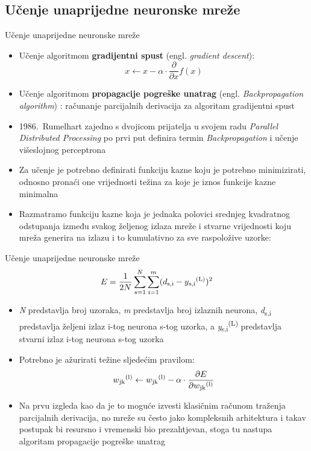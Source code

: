 \documentclass{beamer}
\begin{document}
    \subsection{Učenje unaprijedne neuronske mreže}
        \begin{frame}{Učenje unaprijedne neuronske mreže}
            \begin{itemize}
                \item Učenje algoritmom \textbf{gradijentni spust} (engl. \textit{gradient descent}):
                \[x \leftarrow x - \alpha \cdot{\frac{\partial}{\partial x}}f(x)\]
                \item Učenje algoritmom \textbf{propagacije pogreške unatrag} (engl. \textit{Backpropagation algorithm}) : računanje parcijalnih derivacija za algoritam gradijentni spust
                \item 1986.\ Rumelhart zajedno s dvojicom prijatelja u svojem radu \textit{Parallel Distributed Processing} po prvi put definira termin \textit{Backpropagation} i učenje višeslojnog perceptrona
                \item Za učenje je potrebno definirati funkciju kazne koju je potrebno minimizirati, odnosno pronaći one vrijednosti težina za koje je iznos funkcije kazne minimalna
                \item Razmatramo funkciju kazne koja je jednaka polovici srednjeg kvadratnog odstupanja između svakog željenog izlaza mreže i stvarne vrijednosti koju mreža generira na izlazu i to kumulativno za sve raspoložive uzorke:
            \end{itemize}
        \end{frame}
        \begin{frame}{Učenje unaprijedne neuronske mreže}
            \[E = \frac{1}{2N}\sum\limits_{s=1}^N\sum\limits_{i=1}^m(d\textsubscript{s,i} - y\textsubscript{s,i}\textsuperscript{(L)})^2\]
            \begin{itemize}
                \item \textit{N} predstavlja broj uzoraka, \textit{m} predstavlja broj izlaznih neurona, \textit{d}\textsubscript{s,i} predstavlja željeni izlaz i-tog neurona s-tog uzorka, a \textit{y}\textsubscript{s,i}\textsuperscript{(L)} predstavlja stvarni izlaz i-tog neurona s-tog uzorka
                \item Potrebno je ažurirati težine sljedećim pravilom:
                \[w\textsubscript{jk}\textsuperscript{(l)} \leftarrow  w\textsubscript{jk}\textsuperscript{(l)} - \alpha \cdot{\frac{\partial E}{\partial w\textsubscript{jk}\textsuperscript{(l)}}}\]
                \item Na prvu izgleda kao da je to moguće izvesti klasičnim računom traženja parcijalnih derivacija, no mreže su često jako kompleksnih arhitektura i takav postupak bi resursno i vremenski bio prezahtjevan, stoga tu nastupa algoritam propagacije pogreške unatrag
            \end{itemize}
        \end{frame}
\end{document}
